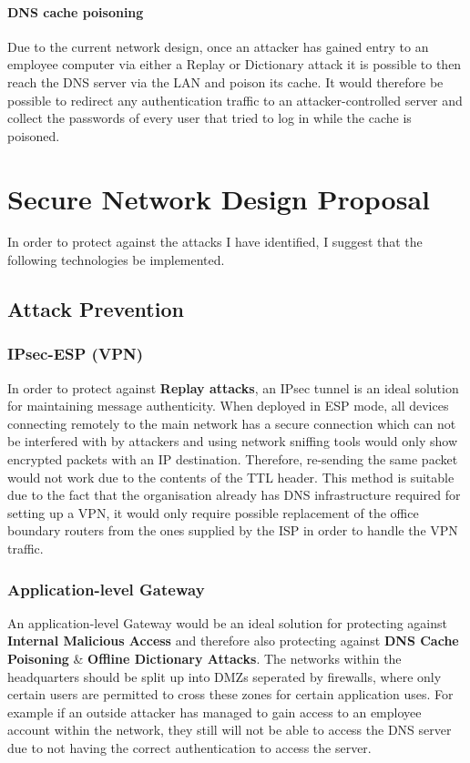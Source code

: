 \documentclass[11pt]{article}
\begin{document}
      \paragraph{DNS cache poisoning}
        Due to the current network design, once an attacker has gained entry to an employee computer via either a Replay or Dictionary attack it is possible to then reach the DNS server via the LAN and poison its cache. It would therefore be possible to redirect any authentication traffic to an attacker-controlled server and collect the passwords of every user that tried to log in while the cache is poisoned.

    \section{Secure Network Design Proposal}
      In order to protect against the attacks I have identified, I suggest that the following technologies be implemented.

      \subsection{Attack Prevention}
        \subsubsection{IPsec-ESP (VPN)} \label{ipsec}
          In order to protect against \textbf{Replay attacks}, an IPsec tunnel is an ideal solution for maintaining message authenticity. When deployed in ESP mode, all devices connecting remotely to the main network has a secure connection which can not be interfered with by attackers and using network sniffing tools would only show encrypted packets with an IP destination. Therefore, re-sending the same packet would not work due to the contents of the TTL header. This method is suitable due to the fact that the organisation already has DNS infrastructure required for setting up a VPN, it would only require possible replacement of the office boundary routers from the ones supplied by the ISP in order to handle the VPN traffic.

        \subsubsection{Application-level Gateway} \label{app-gateway}
          An application-level Gateway would be an ideal solution for protecting against \textbf{Internal Malicious Access} and therefore also protecting against \textbf{DNS Cache Poisoning} \& \textbf{Offline Dictionary Attacks}. The networks within the headquarters should be split up into DMZs seperated by firewalls, where only certain users are permitted to cross these zones for certain application uses. For example if an outside attacker has managed to gain access to an employee account within the network, they still will not be able to access the DNS server due to not having the correct authentication to access the server.
\end{document}
